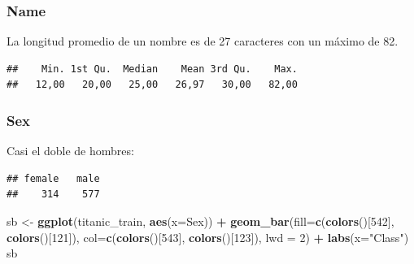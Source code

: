 \documentclass[]{article}
\newenvironment{Shaded}{\begin{snugshade}}{\end{snugshade}}
\newcommand{\KeywordTok}[1]{\textcolor[rgb]{0.13,0.29,0.53}{\textbf{#1}}}
\newcommand{\DataTypeTok}[1]{\textcolor[rgb]{0.13,0.29,0.53}{#1}}
\newcommand{\DecValTok}[1]{\textcolor[rgb]{0.00,0.00,0.81}{#1}}
\newcommand{\StringTok}[1]{\textcolor[rgb]{0.31,0.60,0.02}{#1}}
\newcommand{\CommentTok}[1]{\textcolor[rgb]{0.56,0.35,0.01}{\textit{#1}}}
\newcommand{\OperatorTok}[1]{\textcolor[rgb]{0.81,0.36,0.00}{\textbf{#1}}}
\newcommand{\NormalTok}[1]{#1}
\begin{document}
\subsubsection{Name}\label{name}

La longitud promedio de un nombre es de 27 caracteres con un máximo de
82.

\begin{Shaded}
\end{Shaded}

\begin{verbatim}
##    Min. 1st Qu.  Median    Mean 3rd Qu.    Max. 
##   12,00   20,00   25,00   26,97   30,00   82,00
\end{verbatim}

\subsubsection{Sex}\label{sex}

Casi el doble de hombres:

\begin{Shaded}
\end{Shaded}

\begin{verbatim}
## female   male 
##    314    577
\end{verbatim}

\begin{Shaded}
\begin{Highlighting}[]
\NormalTok{sb <-}\StringTok{ }\KeywordTok{ggplot}\NormalTok{(titanic_train, }\KeywordTok{aes}\NormalTok{(}\DataTypeTok{x=}\NormalTok{Sex)) }\OperatorTok{+}\StringTok{ }
\StringTok{  }\KeywordTok{geom_bar}\NormalTok{(}\DataTypeTok{fill=}\KeywordTok{c}\NormalTok{(}\KeywordTok{colors}\NormalTok{()[}\DecValTok{542}\NormalTok{], }\KeywordTok{colors}\NormalTok{()[}\DecValTok{121}\NormalTok{]), }
           \DataTypeTok{col=}\KeywordTok{c}\NormalTok{(}\KeywordTok{colors}\NormalTok{()[}\DecValTok{543}\NormalTok{], }\KeywordTok{colors}\NormalTok{()[}\DecValTok{123}\NormalTok{]), }\DataTypeTok{lwd =} \DecValTok{2}\NormalTok{) }\OperatorTok{+}\StringTok{ }
\StringTok{  }\KeywordTok{labs}\NormalTok{(}\DataTypeTok{x=}\StringTok{"Class"}\NormalTok{)}
\NormalTok{sb}
\end{Highlighting}
\end{Shaded}
\end{document}
